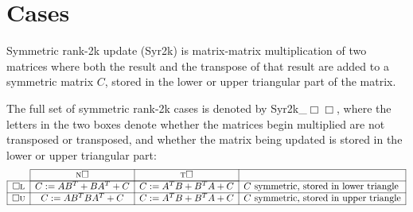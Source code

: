 \chapter{Cases}
Symmetric rank-2k update ({\sc Syr2k}) 
is matrix-matrix multiplication of two matrices where both the result and the transpose of that result are added to a symmetric matrix $ C $, stored in the lower or upper triangular part of the matrix.  

The full set of 
symmetric rank-2k cases 
is denoted by {\sc Syr2k\_$\Box \Box $}, 
where the letters in the two boxes denote whether the 
matrices begin multiplied are {\sc n}ot transposed or {\sc t}ransposed, 
and whether the matrix being updated is stored in the 
{\sc l}ower or {\sc u}pper triangular part:
\[
\begin{array}{c |  c   |   c  | l |} \cline{2-4}
&  {\mbox{\sc n} \Box  }
&  {\mbox{\sc t} \Box  } 
&
\\ \cline{2-3}
\hline
\multicolumn{1}{|c |}{ \Box \mbox{\sc l}} & C := A B^T + B A^T + C &
C := A^T B + B^T A + C 
& \mbox{$ C $ symmetric, stored in lower triangle}\\
\hline
\multicolumn{1}{|c |}{ \Box \mbox{\sc u}} & C := A B^T B A^T + C &
C := A^T B  + B^T A + C 
& \mbox{$ C $ symmetric, stored in upper triangle}\\
\hline
\end{array}
\]
